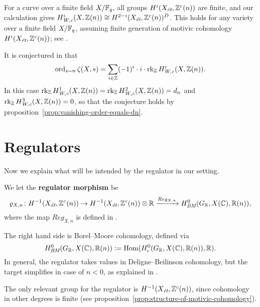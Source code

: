 \documentclass{article}
\numberwithin{equation}{section}
\begin{document}
\begin{remark}
  For a curve over a finite field $X/\FF_q$, all groups $H^i (X_\et, \ZZ^c(n))$
  are finite, and our calculation gives
  $H^i_\Wc (X, \ZZ(n)) \cong H^{2-i} (X_\et, \ZZ^c(n))^D$.
  This holds for any variety over a finite field $X/\FF_q$, assuming finite
  generation of motivic cohomology $H^i (X_\et, \ZZ^c(n))$; see
  \cite[Proposition~7.7]{Beshenov-Weil-etale-1}.
\end{remark}

\begin{remark}
  It is conjectured in \cite[\S 3]{Beshenov-Weil-etale-2} that
  \[ \ord_{s = n} \zeta (X,s) =
    \sum_{i\in \ZZ} (-1)^i\cdot i\cdot\rk_\ZZ H^i_\Wc (X,\ZZ(n)). \]
  In this case $\rk_\ZZ H^1_\Wc (X,\ZZ(n)) = \rk_\ZZ H^2_\Wc (X,\ZZ(n)) = d_n$
  and $\rk_\ZZ H^3_\Wc (X,\ZZ(n)) = 0$, so that the conjecture holds
  by proposition~\ref{prop:vanishing-order-equals-dn}.
\end{remark}


\section{Regulators}
\label{sec:regulators}

Now we explain what will be intended by the regulator in our setting.

\begin{definition}
  We let the \textbf{regulator morphism} be
  \[ \varrho_{X,n}\colon
    H^{-1} (X_\et, \ZZ^c (n)) \to
    H^{-1} (X_\et, \ZZ^c (n)) \otimes \RR \xrightarrow{Reg_{X,n}}
    H^0_\BM (G_\RR, X(\CC), \RR(n)), \]
  where the map $Reg_{X,n}$ is defined in \cite[\S 2]{Beshenov-Weil-etale-2}.
\end{definition}

The right hand side is Borel--Moore cohomology, defined via
\[ H^0_\BM (G_\RR, X(\CC), \RR(n)) \dfn
  \Hom (H^0_c (G_\RR, X(\CC), \RR(n)), \RR). \]
In general, the regulator takes values in Deligne--Beilinson cohomology, but the
target simplifies in case of $n < 0$, as explained in
\cite[\S 2]{Beshenov-Weil-etale-2}.

\begin{remark}
  The only relevant group for the regulator is $H^{-1} (X_\et, \ZZ^c (n))$,
  since cohomology in other degrees is finite
  (see proposition~\ref{prop:structure-of-motivic-cohomology}).
\end{remark}
\end{document}
